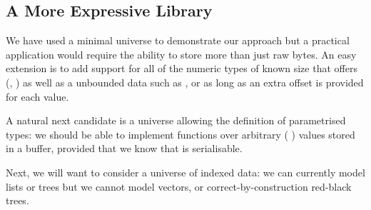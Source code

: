 \subsection{A More Expressive Library}

We have used a minimal universe to demonstrate our approach but a practical
application would require the ability to store more than just raw bytes.
An easy extension is to add support for all of the numeric types of
known size that \idris{} offers
(, )
as well as a unbounded data such as , or 
as long as an extra offset is provided for each value.

A natural next candidate is a universe allowing the definition of parametrised
types: we should be able to implement functions over arbitrary
( ) values stored in a buffer,
provided that we know that  is serialisable.

Next, we will want to consider a universe of indexed data: we can currently
model lists or trees but we cannot model vectors, or correct-by-construction
red-black trees.
